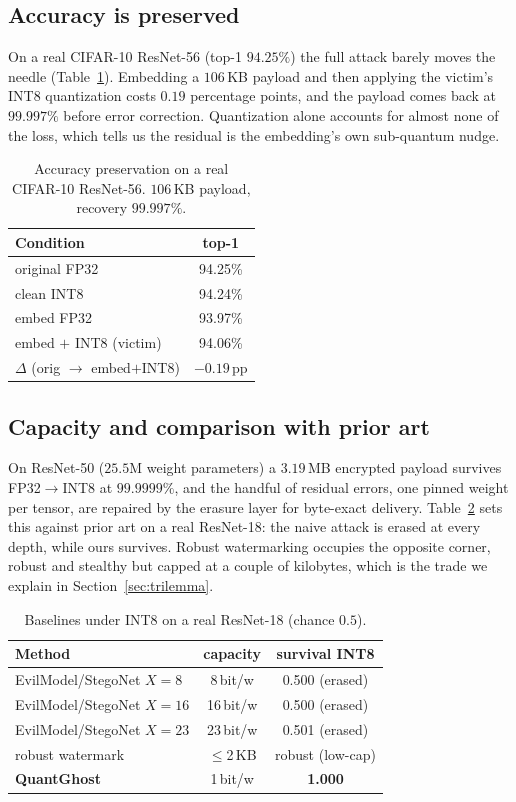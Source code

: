\documentclass[10pt,journal]{IEEEtran}
\theoremstyle{remark}
\newcommand{\sys}{\mbox{QuantGhost}}
\begin{document}
\subsection{Accuracy is preserved}
On a real CIFAR-10 ResNet-56 (top-1 $94.25\%$) the full attack barely moves the needle
(Table~\ref{tab:acc}). Embedding a $106$\,KB payload and then applying the victim's
INT8 quantization costs $0.19$ percentage points, and the payload comes back at
$99.997\%$ before error correction. Quantization alone accounts for almost none of the
loss, which tells us the residual is the embedding's own sub-quantum nudge.

\begin{table}[!tb]\centering
\caption{Accuracy preservation on a real CIFAR-10 ResNet-56. $106$\,KB payload, recovery $99.997\%$.}
\label{tab:acc}
\begin{tabular*}{\columnwidth}{@{\extracolsep{\fill}}lc@{}}
\toprule
Condition & top-1\\
\midrule
original FP32 & 94.25\%\\
clean INT8 & 94.24\%\\
embed FP32 & 93.97\%\\
embed $+$ INT8 (victim) & 94.06\%\\
\midrule
$\Delta$ (orig $\to$ embed$+$INT8) & $-0.19$\,pp\\
\bottomrule
\end{tabular*}
\end{table}

\subsection{Capacity and comparison with prior art}
On ResNet-50 ($25.5$M weight parameters) a $3.19$\,MB encrypted payload survives
FP32$\to$INT8 at $99.9999\%$, and the handful of residual errors, one pinned weight
per tensor, are repaired by the erasure layer for byte-exact delivery.
Table~\ref{tab:baseline} sets this against prior art on a real ResNet-18: the naive
attack is erased at every depth, while ours survives. Robust watermarking
\cite{tondi2022robust,li2021stdm} occupies the opposite corner, robust and stealthy
but capped at a couple of kilobytes, which is the trade we explain in
Section~\ref{sec:trilemma}.

\begin{table}[!tb]\centering
\caption{Baselines under INT8 on a real ResNet-18 (chance $0.5$).}
\label{tab:baseline}
\begin{tabular*}{\columnwidth}{@{\extracolsep{\fill}}lcc@{}}
\toprule
Method & capacity & survival INT8\\
\midrule
EvilModel/StegoNet $X{=}8$ & 8\,bit/w & 0.500 (erased)\\
EvilModel/StegoNet $X{=}16$ & 16\,bit/w & 0.500 (erased)\\
EvilModel/StegoNet $X{=}23$ & 23\,bit/w & 0.501 (erased)\\
robust watermark & $\le$2\,KB & robust (low-cap)\\
\textbf{\sys} & 1\,bit/w & \textbf{1.000}\\
\bottomrule
\end{tabular*}
\end{table}
\end{document}
